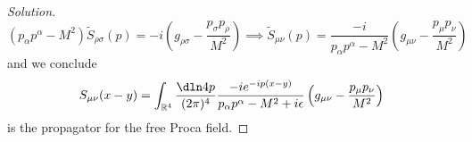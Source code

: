 \begin{proof}[Solution]
   \begin{equation*}
      (p_\alpha p^\alpha - M^2) \tilde{S}_{\rho\sigma}(p) = -i\left( g_{\rho \sigma} - \frac{p_\sigma p_\rho}{M^2}\right) \implies \tilde{S}_{\mu\nu}(p) = \frac{-i}{p_\alpha p^\alpha - M^2} \left(g_{\mu\nu} - \frac{p_{\mu}p_\nu}{M^2}\right)
   \end{equation*}
   and we conclude
   \begin{equation*}
      S_{\mu\nu}(x - y) = \int_{\mathbb{R}^4} \frac{\dln4p}{(2\pi)^4} \frac{-i e^{-ip(x - y)}}{p_\alpha p^\alpha - M^2 + i \epsilon}\left(g_{\mu\nu} - \frac{p_\mu p_\nu}{M^2}\right)
   \end{equation*}
   is the propagator for the free Proca field.
\end{proof}
